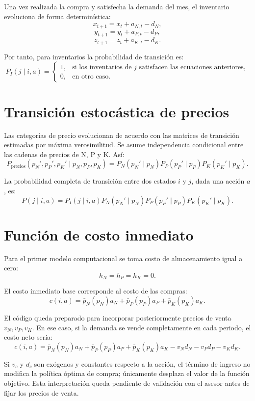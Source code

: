 \documentclass[11pt]{article}
\begin{document}
Una vez realizada la compra y satisfecha la demanda del mes, el inventario evoluciona de forma determinística:
\[
x_{t+1}=x_t+a_{N,t}-d_N,
\]
\[
y_{t+1}=y_t+a_{P,t}-d_P,
\]
\[
z_{t+1}=z_t+a_{K,t}-d_K.
\]

Por tanto, para inventarios la probabilidad de transición es:
\[
P_I(j\mid i,a)=
\begin{cases}
1, & \text{si los inventarios de }j\text{ satisfacen las ecuaciones anteriores},\\
0, & \text{en otro caso}.
\end{cases}
\]

\section{Transición estocástica de precios}

Las categorías de precio evolucionan de acuerdo con las matrices de transición estimadas por máxima verosimilitud. Se asume independencia condicional entre las cadenas de precios de N, P y K. Así:
\[
P_{\text{precios}}(p_N',p_P',p_K'\mid p_N,p_P,p_K)
=
P_N(p_N'\mid p_N)
P_P(p_P'\mid p_P)
P_K(p_K'\mid p_K).
\]

La probabilidad completa de transición entre dos estados $i$ y $j$, dada una acción $a$, es:
\[
P(j\mid i,a)=P_I(j\mid i,a)
P_N(p_N'\mid p_N)
P_P(p_P'\mid p_P)
P_K(p_K'\mid p_K).
\]

\section{Función de costo inmediato}

Para el primer modelo computacional se toma costo de almacenamiento igual a cero:
\[
h_N=h_P=h_K=0.
\]

El costo inmediato base corresponde al costo de las compras:
\[
c(i,a)=
\bar p_N(p_N)a_N+
\bar p_P(p_P)a_P+
\bar p_K(p_K)a_K.
\]

El código queda preparado para incorporar posteriormente precios de venta $v_N,v_P,v_K$. En ese caso, si la demanda se vende completamente en cada periodo, el costo neto sería:
\[
c(i,a)=
\bar p_N(p_N)a_N+
\bar p_P(p_P)a_P+
\bar p_K(p_K)a_K
-v_Nd_N-v_Pd_P-v_Kd_K.
\]

Si $v_c$ y $d_c$ son exógenos y constantes respecto a la acción, el término de ingreso no modifica la política óptima de compra; únicamente desplaza el valor de la función objetivo. Esta interpretación queda pendiente de validación con el asesor antes de fijar los precios de venta.
\end{document}
